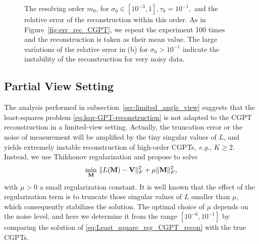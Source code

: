 \begin{figure}[htp]
  \centering
  \caption{The resolving order $m_0$, for $\sigma_0\in[10^{-3},1], \tau_0=10^{-1},$ and
    the relative error of the reconstruction within this order. As in
    Figure~\ref{fig:err_rec_CGPT}, we repeat the experiment 100
    times and the reconstruction is taken as their mean value. The
    large variations of the relative error in (b) for $\sigma_0>10^{-1}$ indicate the
    instability of the reconstruction for very noisy data.}
  \label{fig:rslv_ord_rel_err_CGPT}
\end{figure}

\subsection{Partial View Setting}
\label{sec:recon_cgpt_num2}

The analysis performed in subsection~\ref{sec:limited_angle_view} suggests that the least-squares problem
\eqref{eq:lsqr-GPT-reconstruction} is not adapted to the CGPT
reconstruction in a limited-view setting. Actually, the truncation
error or the noise of measurement will be amplified by the tiny
singular values of $L$, and yields extremely instable
reconstruction of high-order CGPTs, {\it e.g.}, $K\geq 2$.
Instead, we use
Thikhonov regularization and propose to solve
\begin{align}
  \label{eq:Least_square_reg_CGPT_recon}
    \min_{\mathbf{M}}\  \mathopen\| L(\mathbf{M}) - \mathbf{V} \mathclose\|_F^2 + \mu \mathopen\| \mathbf{M} \mathclose\|_F^2,
\end{align}
with $\mu>0$ a small regularization constant. It is well known
that the effect of the regularization term is to truncate those
singular values of $L$ smaller than $\mu$, which consequently
stabilizes the solution. The optimal choice of $\mu$ depends on
the noise level, and here we determine it from the range
$[10^{-6}, 10^{-1}]$ by comparing the solution of
\eqref{eq:Least_square_reg_CGPT_recon} with the true CGPTs.

